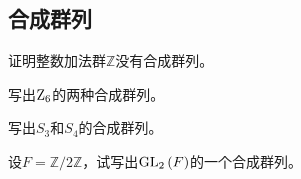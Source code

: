 \subsection{合成群列}
\begin{prob}
证明整数加法群$\mathbb{Z}$没有合成群列。
\end{prob}
\begin{prob}
写出${\rm Z}_6$的两种合成群列。
\end{prob}
\begin{prob}
写出$S_{3}$和$S_{4}$的合成群列。
\end{prob}
\begin{prob}
设$F=\mathbb{Z}/2\mathbb{Z}$，试写出${\rm GL_{2}}\left(F\right)$的一个合成群列。
\end{prob}
